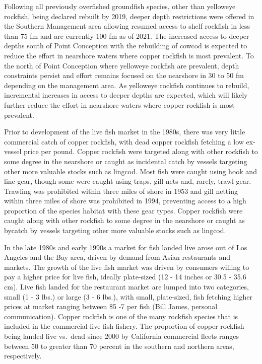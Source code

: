 \documentclass[11pt,
  english,
  letterpaper,
]{article}
\begin{document}
Following all previously overfished groundfish species, other than yelloweye rockfish, being declared rebuilt by 2019, deeper depth restrictions were offered in the Southern Management area allowing resumed access to shelf rockfish in less than 75 fm and are currently 100 fm as of 2021. The increased access to deeper depths south of Point Conception with the rebuilding of cowcod is expected to reduce the effort in nearshore waters where copper rockfish is most prevalent. To the north of Point Conception where yelloweye rockfish are prevalent, depth constraints persist and effort remains focused on the nearshore in 30 to 50 fm depending on the management area. As yelloweye rockfish continues to rebuild, incremental increases in access to deeper depths are expected, which will likely further reduce the effort in nearshore waters where copper rockfish is most prevalent.

Prior to development of the live fish market in the 1980s, there was very little commercial catch of copper rockfish, with dead copper rockfish fetching a low ex-vessel price per pound. Copper rockfish were targeted along with other rockfish to some degree in the nearshore or caught as incidental catch by vessels targeting other more valuable stocks such as lingcod. Most fish were caught using hook and line gear, though some were caught using traps, gill nets and, rarely, trawl gear. Trawling was prohibited within three miles of shore in 1953 and gill netting within three miles of shore was prohibited in 1994, preventing access to a high proportion of the species habitat with these gear types. Copper rockfish were caught along with other rockfish to some degree in the nearshore or caught as bycatch by vessels targeting other more valuable stocks such as lingcod.

In the late 1980s and early 1990s a market for fish landed live arose out of Los Angeles and the Bay area, driven by demand from Asian restaurants and markets. The growth of the live fish market was driven by consumers willing to pay a higher price for live fish, ideally plate-sized (12 - 14 inches or 30.5 - 35.6 cm). Live fish landed for the restaurant market are lumped into two categories, small (1 - 3 lbs.) or large (3 - 6 lbs.), with small, plate-sized, fish fetching higher prices at market ranging between \$5 -7 per fish (Bill James, personal communication). Copper rockfish is one of the many rockfish species that is included in the commercial live fish fishery. The proportion of copper rockfish being landed live vs.~dead since 2000 by California commercial fleets ranges between 50 to greater than 70 percent in the southern and northern areas, respectively.
\end{document}
